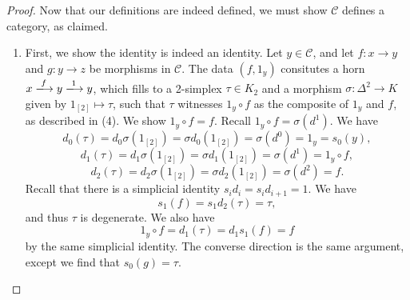 \begin{proof}
	Now that our definitions are indeed defined, we must show $\mathcal{C}$ defines a category, as claimed.
	\begin{enumerate}
		\item First, we show the identity is indeed an identity. Let $y\in \mathcal{C} $, and let $f : x \to y$ and $g : y \to z$ be morphisms in $\mathcal{C} $. The data $(f,1_y)$ consitutes a horn $x\xlongrightarrow{f}y\xlongrightarrow{1}y$, which fills to a 2-simplex $\tau\in K_2$ and a morphism $\sigma:\Delta^2\to K$ given by $1_{[2]} \mapsto \tau$, such that $\tau$ witnesses $1_y\circ f$ as the composite of $1_y$ and $f$, as described in (4). We show $1_y\circ f=f$. Recall $1_y\circ f=\sigma(d^1)$. We have
			\[
				d_0(\tau)=d_0\sigma(1_{[2]} )=\sigma d_0(1_{[2]} )=\sigma(d^0)=1_y=s_0(y),
			\]
			\[
				d_1(\tau)=d_1\sigma(1_{[2]} )=\sigma d_1(1_{[2]} )=\sigma(d^1)=1_y\circ f,
			\]
			\[
				d_2(\tau)=d_2\sigma(1_{[2]} )=\sigma d_2(1_{[2]} )=\sigma(d^2)=f.
			\]
			Recall that there is a simplicial identity $s_id_{i} =s_id_{i+1} =1$. We have
			\[
				s_1(f)=s_1d_2(\tau)=\tau,
			\]
			and thus $\tau$ is degenerate. We also have
			\[
				1_y\circ f=d_1(\tau)=d_1s_1(f)=f
			\]
			by the same simplicial identity. The converse direction is the same argument, except we find that $s_0(g)=\tau$.


\end{enumerate}
\end{proof}
